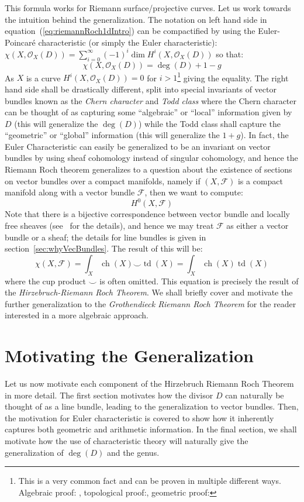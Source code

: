 \documentclass{book}
\newcommand{\CF}{{\mathcal{F}}}
\newcommand{\CO}{{\mathcal{O}}}
\newcommand{\ch}{{\operatorname{ch}}}
\renewcommand{\deg}{{\operatorname{deg}}}
\newcommand{\td}{{\operatorname{td}}}
\renewcommand{\ch}{{\operatorname{ch}}}
\begin{document}
This formula works for Riemann surface/projective curves. Let us work towards the intuition behind the
generalization. The notation on left hand side in equation~(\ref{eq:riemannRoch1dIntro}) can be compactified
by using the Euler-Poincar\'e characteristic (or simply the Euler characteristic): $\chi(X, \CO_X(D)) =
\sum_{i=0}^\infty (-1)^i \dim H^i(X, \CO_X(D))$ so that:
\[
  \chi(X, \CO_X(D)) = \deg(D) + 1-g
\]
As $X$ is a curve $H^i(X, \CO_X(D)) = 0$ for $i > 1$\footnote{This is a very common fact and can be proven  in
  multiple different ways. Algebraic proof: \cite[section~28.3]{NateAlgGeo}, topological
proof:\cite[chapter~3]{NateAlgTop}, geometric proof:\cite[chapter~3]{NateKTheory}}   giving the equality. The
right hand side shall be drastically different, split into special invariants of vector bundles known as the
\emph{Chern character} and \emph{Todd class} where the Chern character can be thought of as capturing some ``algebraic'' or
``local'' information given by $D$ (this will generalize the $\deg(D)$) while the Todd class shall capture the
``geometric'' or ``global'' information (this will generalize the $1+g$). In fact, the Euler Characteristic
can easily be generalized to be an invariant on vector bundles by using sheaf cohomology instead of singular
cohomology, and hence the Riemann Roch theorem generalizes to a question about the existence of sections on
vector bundles over a compact manifolds, namely if $(X,\CF)$ is a compact manifold along with a vector bundle
$\CF$, then we want to compute:
\[
  H^0(X, \CF)
\]
Note that there is a bijective correspondence between vector bundle and locally free sheaves
(see~\cite[chapter~4]{NateAlgGeo} for the details), and hence we may treat $\CF$ as either a vector bundle or
a sheaf; the details for line bundles is given in section~\ref{sec:whyVecBundles}. The result of this will be:
\[
  \chi(X, \CF) = \int_X \ch(X)\smile \td(X) = \int_X \ch(X)\td(X)
\]
where the cup product $\smile$ is often omitted. This equation is precisely the result of the
\emph{Hirzebruch-Riemann Roch Theorem}. We shall briefly cover and motivate the further generalization to the
\emph{Grothendieck Riemann Roch Theorem} for the reader interested in a more algebraic approach.

\section{Motivating the Generalization}

Let us now motivate each component of the Hirzebruch Riemann Roch Theorem in more detail. The first section
motivates how the divisor $D$ can naturally be thought of as a line bundle, leading to the generalization to
vector bundles. Then, the motivation for Euler characteristic is covered to show how it inherently captures
both geometric and arithmetic information. In the final section, we shall motivate how the use of characteristic
theory will naturally give the generalization of $\deg(D)$ and the genus.
\end{document}
